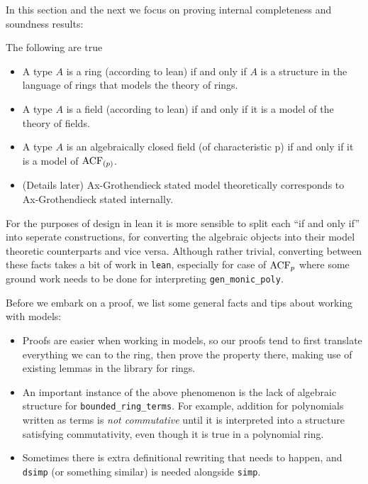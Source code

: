 In this section and the next we focus on proving internal
completeness and soundness results:
\begin{prop}
  The following are true
  \begin{itemize}
    \item A type $A$ is a ring (according to lean) if and only if
          $A$ is a structure in the language of rings
          that models the theory of rings.
    \item A type $A$ is a field (according to lean) if and only if
          it is a model of the theory of fields.
    \item A type $A$ is an algebraically closed field (of characteristic p)
          if and only if it is a model of $\operatorname{ACF}_{(p)}$.
    \item (Details later) Ax-Grothendieck stated model theoretically corresponds to
          Ax-Grothendieck stated internally.
  \end{itemize}
  For the purposes of design in lean it is
  more sensible to split each ``if and only if'' into seperate constructions,
  for converting the algebraic objects into their model theoretic counterparts
  and vice versa.
  Although rather trivial,
  converting between these facts takes a bit of work in \texttt{lean},
  especially for case of $\operatorname{ACF}_{p}$
  where some ground work needs to be done for interpreting \texttt{gen\_monic\_poly}.
\end{prop}

Before we embark on a proof,
we list some general facts and tips about working with models:
\begin{itemize}
  \item Proofs are easier when working in models, so our proofs tend to
        first translate everything we can to the ring,
        then prove the property there,
        making use of existing lemmas in the library for rings.
  \item An important instance of the above phenomenon is the lack
        of algebraic structure for \texttt{bounded\_ring\_terms}.
        For example, addition for polynomials written as terms
        is \textit{not commutative} until it is interpreted into a structure
        satisfying commutativity,
        even though it is true in a polynomial ring.
  \item Sometimes there is extra definitional rewriting that needs to happen,
        and \texttt{dsimp} (or something similar) is needed alongside \texttt{simp}.
\end{itemize}

